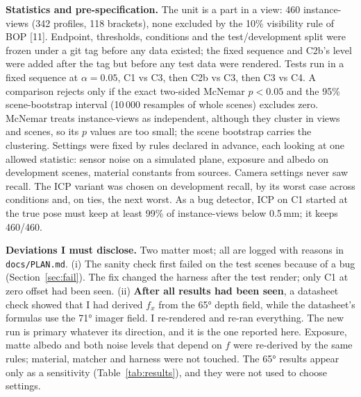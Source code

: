 \documentclass[10pt,a4paper]{article}
\newcommand{\para}[1]{\textbf{#1}\enspace}
\newcommand{\cte}[1]{[#1]}
\begin{document}
\para{Statistics and pre-specification.} The unit is a part in a view: 460 instance-views (342 profiles, 118 brackets), none excluded by the 10\% visibility rule of BOP \cte{11}. Endpoint, thresholds, conditions and the test/development split were frozen under a git tag before any data existed; the fixed sequence and C2b's level were added after the tag but before any test data were rendered. Tests run in a fixed sequence at $\alpha=0.05$, C1 vs C3, then C2b vs C3, then C3 vs C4. A comparison rejects only if the exact two-sided McNemar $p<0.05$ and the 95\% scene-bootstrap interval (10\,000 resamples of whole scenes) excludes zero. McNemar treats instance-views as independent, although they cluster in views and scenes, so its $p$ values are too small; the scene bootstrap carries the clustering. Settings were fixed by rules declared in advance, each looking at one allowed statistic: sensor noise on a simulated plane, exposure and albedo on development scenes, material constants from sources. Camera settings never saw recall. The ICP variant was chosen on development recall, by its worst case across conditions and, on ties, the next worst. As a bug detector, ICP on C1 started at the true pose must keep at least 99\% of instance-views below 0.5\,mm; it keeps 460/460.

\para{Deviations I must disclose.} Two matter most; all are logged with reasons in \texttt{docs/PLAN.md}. (i) The sanity check first failed on the test scenes because of a bug (Section~\ref{sec:fail}). The fix changed the harness after the test render; only C1 at zero offset had been seen. (ii) \textbf{After all results had been seen}, a datasheet check showed that I had derived $f_x$ from the 65° depth field, while the datasheet's formulas use the 71° imager field. I re-rendered and re-ran everything. The new run is primary whatever its direction, and it is the one reported here. Exposure, matte albedo and both noise levels that depend on $f$ were re-derived by the same rules; material, matcher and harness were not touched. The 65° results appear only as a sensitivity (Table~\ref{tab:results}), and they were not used to choose settings.
\end{document}

